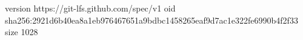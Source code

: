 version https://git-lfs.github.com/spec/v1
oid sha256:2921d6b40ea8a1eb976467651a9bdbc1458265eaf9d7ac1e322fe6990b4f2f33
size 1028
